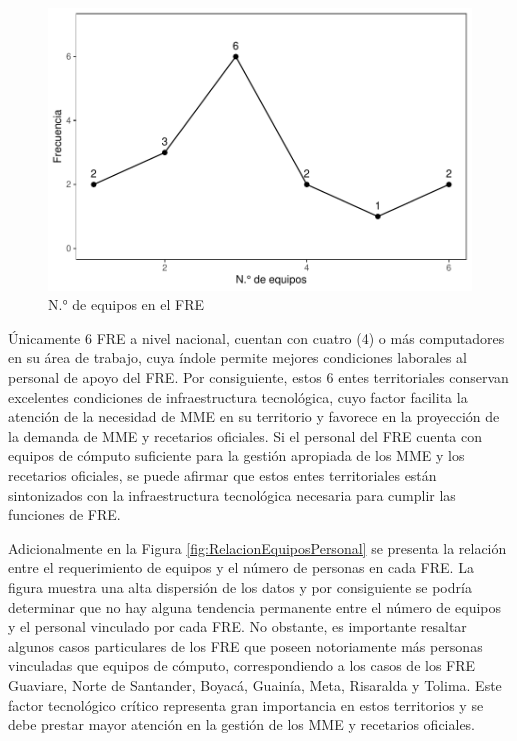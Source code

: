 \documentclass[
]{book}
\begin{document}
\begin{figure}
\includegraphics[width=0.85\linewidth]{InformeFinal_files/figure-latex/EquiposComputo-1} \caption{N.° de equipos en el FRE}\label{fig:EquiposComputo}
\end{figure}

Únicamente 6 FRE a nivel nacional, cuentan con cuatro (4) o más computadores en su área de trabajo, cuya índole permite mejores condiciones laborales al personal de apoyo del FRE. Por consiguiente, estos 6 entes territoriales conservan excelentes condiciones de infraestructura tecnológica, cuyo factor facilita la atención de la necesidad de MME en su territorio y favorece en la proyección de la demanda de MME y recetarios oficiales. Si el personal del FRE cuenta con equipos de cómputo suficiente para la gestión apropiada de los MME y los recetarios oficiales, se puede afirmar que estos entes territoriales están sintonizados con la infraestructura tecnológica necesaria para cumplir las funciones de FRE.

Adicionalmente en la Figura \ref{fig:RelacionEquiposPersonal} se presenta la relación entre el requerimiento de equipos y el número de personas en cada FRE. La figura muestra una alta dispersión de los datos y por consiguiente se podría determinar que no hay alguna tendencia permanente entre el número de equipos y el personal vinculado por cada FRE. No obstante, es importante resaltar algunos casos particulares de los FRE que poseen notoriamente más personas vinculadas que equipos de cómputo, correspondiendo a los casos de los FRE Guaviare, Norte de Santander, Boyacá, Guainía, Meta, Risaralda y Tolima. Este factor tecnológico crítico representa gran importancia en estos territorios y se debe prestar mayor atención en la gestión de los MME y recetarios oficiales.
\end{document}
